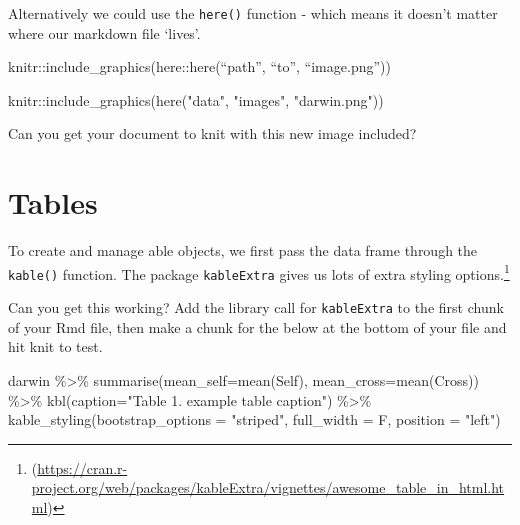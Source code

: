 \documentclass[
]{book}
\makeatletter
\newenvironment{Shaded}{\begin{snugshade}}{\end{snugshade}}
\newcommand{\AttributeTok}[1]{\textcolor[rgb]{0.77,0.63,0.00}{#1}}
\newcommand{\FunctionTok}[1]{\textcolor[rgb]{0.00,0.00,0.00}{#1}}
\newcommand{\NormalTok}[1]{#1}
\newcommand{\SpecialCharTok}[1]{\textcolor[rgb]{0.00,0.00,0.00}{#1}}
\newcommand{\StringTok}[1]{\textcolor[rgb]{0.31,0.60,0.02}{#1}}
\newenvironment{kframe}{%
\medskip{}
\setlength{\fboxsep}{.8em}
 \def\at@end@of@kframe{}%
 \ifinner\ifhmode%
  \def\at@end@of@kframe{\end{minipage}}%
  \begin{minipage}{\columnwidth}%
 \fi\fi%
 \def\FrameCommand##1{\hskip\@totalleftmargin \hskip-\fboxsep
 \colorbox{shadecolor}{##1}\hskip-\fboxsep
     \hskip-\linewidth \hskip-\@totalleftmargin \hskip\columnwidth}%
 \MakeFramed {\advance\hsize-\width
   \@totalleftmargin\z@ \linewidth\hsize
   \@setminipage}}%
 {\par\unskip\endMakeFramed%
 \at@end@of@kframe}
\newenvironment{block}[1]
  {
  \begin{itemize}
  \renewcommand{\labelitemi}{
    \raisebox{-.7\height}[0pt][0pt]{
      {\setkeys{Gin}{width=3em,keepaspectratio}\texttt{[image: images/\#1]}}
    }
  }
  \setlength{\fboxsep}{1em}
  \begin{kframe}
  \item
  }
  {
  \end{kframe}
  \end{itemize}
  }
\newenvironment{rmdquestion}
  {\begin{block}{question}}
  {\end{block}}
\makeatother
\begin{document}
Alternatively we could use the \texttt{here()} function - which means it doesn't matter where our markdown file `lives'.

knitr::include\_graphics(here::here(``path'', ``to'', ``image.png''))

\begin{Shaded}
\begin{Highlighting}[]
\NormalTok{knitr}\SpecialCharTok{::}\FunctionTok{include\_graphics}\NormalTok{(}\FunctionTok{here}\NormalTok{(}\StringTok{"data"}\NormalTok{, }\StringTok{"images"}\NormalTok{, }\StringTok{"darwin.png"}\NormalTok{))}
\end{Highlighting}
\end{Shaded}

\begin{rmdquestion}
Can you get your document to knit with this new image included?
\end{rmdquestion}

\hypertarget{tables}{%
\section{Tables}\label{tables}}

To create and manage able objects, we first pass the data frame through the \texttt{kable()} function. The package \texttt{kableExtra} \citet{R-kableExtra} gives us lots of extra styling options.\footnote{(\url{https://cran.r-project.org/web/packages/kableExtra/vignettes/awesome_table_in_html.html})}

\begin{rmdquestion}
Can you get this working? Add the library call for \texttt{kableExtra}
to the first chunk of your Rmd file, then make a chunk for the below at
the bottom of your file and hit knit to test.
\end{rmdquestion}

\begin{Shaded}
\begin{Highlighting}[]
\NormalTok{darwin }\SpecialCharTok{\%\textgreater{}\%} 
  \FunctionTok{summarise}\NormalTok{(}\AttributeTok{mean\_self=}\FunctionTok{mean}\NormalTok{(Self),}
            \AttributeTok{mean\_cross=}\FunctionTok{mean}\NormalTok{(Cross)) }\SpecialCharTok{\%\textgreater{}\%} 
  \FunctionTok{kbl}\NormalTok{(}\AttributeTok{caption=}\StringTok{"Table 1. example table caption"}\NormalTok{) }\SpecialCharTok{\%\textgreater{}\%} 
  \FunctionTok{kable\_styling}\NormalTok{(}\AttributeTok{bootstrap\_options =} \StringTok{"striped"}\NormalTok{, }\AttributeTok{full\_width =}\NormalTok{ F, }\AttributeTok{position =} \StringTok{"left"}\NormalTok{)}
\end{Highlighting}
\end{Shaded}
\end{document}

